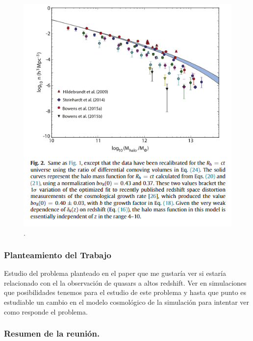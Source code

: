 \begin{figure}
\begin{center}
\includegraphics[scale=0.7]{Figuras/Melia}
\caption{\label{fig:melia} .}
\end{center}
\end{figure}

\subsubsection*{Planteamiento del Trabajo}

Estudio del problema planteado en el paper \cite{steinhardt2016impossibly} que me gustaría ver si estaría relacionado con el la observación de quasars a altos redshift. Ver en simulaciones que posibilidades tenemos para el estudio de este problema y hasta que punto es estudiable un cambio en el modelo cosmológico de la simulación para intentar ver como responde el problema.

\subsubsection*{Resumen de la reunión.}